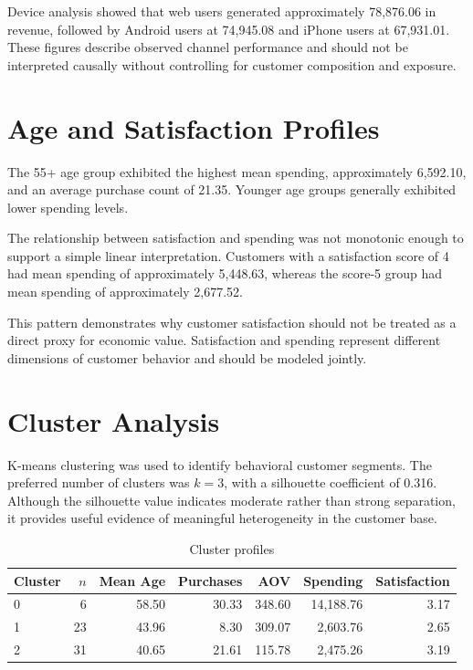 \documentclass[11pt,a4paper]{article}
\begin{document}
Device analysis showed that web users generated approximately 78,876.06
in revenue, followed by Android users at 74,945.08 and iPhone users at
67,931.01. These figures describe observed channel performance and should
not be interpreted causally without controlling for customer composition
and exposure.

\section{Age and Satisfaction Profiles}

The 55+ age group exhibited the highest mean spending, approximately
6,592.10, and an average purchase count of 21.35. Younger age groups
generally exhibited lower spending levels.

The relationship between satisfaction and spending was not monotonic
enough to support a simple linear interpretation. Customers with a
satisfaction score of 4 had mean spending of approximately 5,448.63,
whereas the score-5 group had mean spending of approximately 2,677.52.

This pattern demonstrates why customer satisfaction should not be treated
as a direct proxy for economic value. Satisfaction and spending represent
different dimensions of customer behavior and should be modeled jointly.

\section{Cluster Analysis}

K-means clustering was used to identify behavioral customer segments.
The preferred number of clusters was $k=3$, with a silhouette coefficient
of 0.316. Although the silhouette value indicates moderate rather than
strong separation, it provides useful evidence of meaningful
heterogeneity in the customer base.

\begin{table}[H]
\centering
\caption{Cluster profiles}
\label{tab:clusters}
\begin{tabular}{lrrrrrr}
\toprule
Cluster & $n$ & Mean Age & Purchases & AOV & Spending & Satisfaction \\
\midrule
0 & 6 & 58.50 & 30.33 & 348.60 & 14,188.76 & 3.17 \\
1 & 23 & 43.96 & 8.30 & 309.07 & 2,603.76 & 2.65 \\
2 & 31 & 40.65 & 21.61 & 115.78 & 2,475.26 & 3.19 \\
\bottomrule
\end{tabular}
\end{table}
\end{document}
